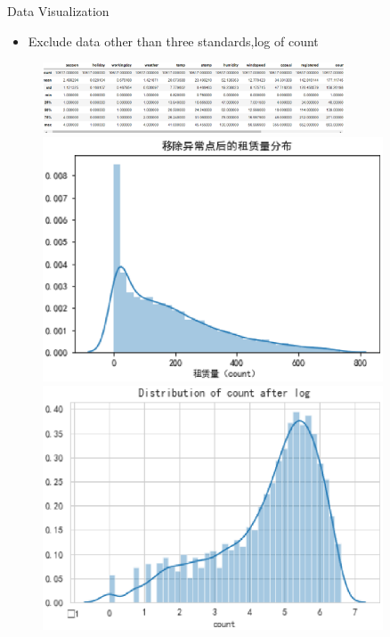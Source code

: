 \documentclass[
 size=14pt,
 paper=smartboard,  %
 mode=present, 		%
 display=slides, 	%
 style=tuliplab,  	%
 pauseslide,
 fleqn,leqno]{powerdot}
\begin{document}
\begin{slide}[toc=,bm=]{Data  Visualization}
  \begin{center}

    {
      \begin{itemize}
        \item Exclude data other than three standards,log of count
      \end{itemize} 
      \begin{figure}
        \centering
        \includegraphics[width=0.8\textwidth]{pic/b.eps}
        \centering
        \begin{minipage}[t]{0.48\textwidth}
        \centering
        \includegraphics[width=0.9\textwidth]{pic/count a.eps}
        \end{minipage}
        \begin{minipage}[t]{0.48\textwidth}
        \centering
        \includegraphics[width=0.9\textwidth]{pic/log.eps}
        \end{minipage}
      \end{figure}   
    }
    \end{center}
  


\end{slide}
\end{document}
